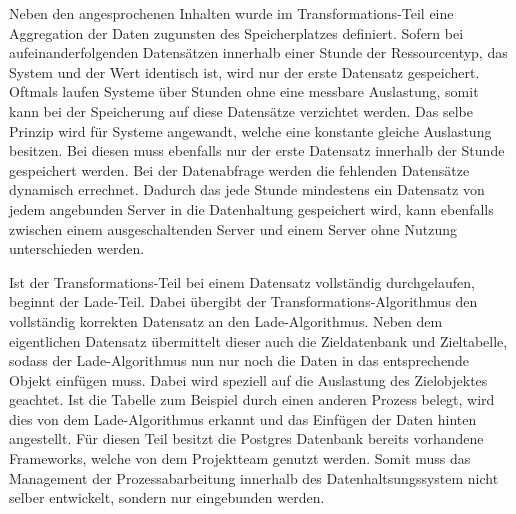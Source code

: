 {Neben den angesprochenen Inhalten wurde im Transformations\hyp{}Teil eine
Aggregation der Daten zugunsten des Speicherplatzes definiert. Sofern
bei aufeinanderfolgenden Datensätzen innerhalb einer Stunde der
Ressourcentyp, das System und der Wert identisch ist, wird nur der erste
Datensatz gespeichert. Oftmals laufen Systeme über Stunden ohne eine messbare
Auslastung, somit kann bei der Speicherung auf diese Datensätze verzichtet
werden. Das selbe Prinzip wird für Systeme angewandt, welche eine konstante
gleiche Auslastung besitzen. Bei diesen muss ebenfalls nur der erste Datensatz
innerhalb der Stunde gespeichert werden. Bei der Datenabfrage werden die
fehlenden Datensätze dynamisch errechnet. Dadurch das jede Stunde mindestens
ein Datensatz von jedem angebunden Server in die Datenhaltung gespeichert wird,
kann ebenfalls zwischen einem ausgeschaltenden Server und einem Server ohne
Nutzung unterschieden werden.

Ist der Transformations\hyp{}Teil bei einem Datensatz vollständig
durchgelaufen, beginnt der Lade\hyp{}Teil. Dabei übergibt der
Transformations\hyp{}Algorithmus den vollständig korrekten Datensatz an den
Lade\hyp{}Algorithmus. Neben dem eigentlichen Datensatz übermittelt dieser
auch die Zieldatenbank und Zieltabelle, sodass der Lade\hyp{}Algorithmus nun
nur noch die Daten in das entsprechende Objekt einfügen muss. Dabei wird
speziell auf die Auslastung des Zielobjektes geachtet. Ist die Tabelle zum
Beispiel durch einen anderen Prozess belegt, wird dies von dem
Lade\hyp{}Algorithmus erkannt und das Einfügen der Daten hinten angestellt. Für
diesen Teil besitzt die Postgres Datenbank bereits vorhandene Frameworks,
welche von dem Projektteam genutzt werden. Somit muss das Management der
Prozessabarbeitung innerhalb des Datenhaltsungssystem nicht selber entwickelt,
sondern nur eingebunden werden.
\nl%

}
